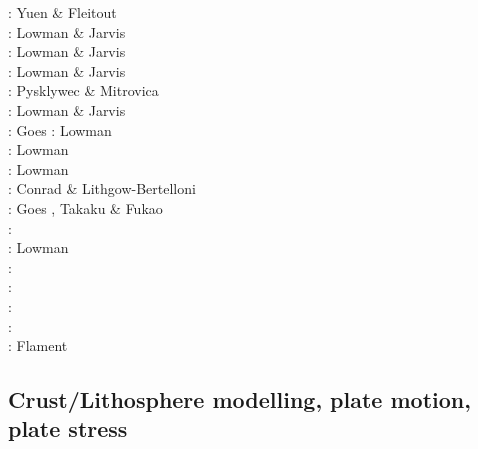 \begin{scriptsize}
\nineteeneightyfive: Yuen \& Fleitout \cite{yufl85}\\
\nineteenninetythree: Lowman \& Jarvis \cite{loja93}\\
\nineteenninetyfive: Lowman \& Jarvis \cite{loja95}\\
\nineteenninetysix: Lowman \& Jarvis \cite{loja96}\\
\nineteenninetyeight: Pysklywec \& Mitrovica \cite{pymi98}\\
\nineteenninetynine: Lowman \& Jarvis \cite{loja99}\\
\twothousand: Goes \etal \cite{golw00}
\twothousandone: Lowman \etal \cite{lokg01} \\
\twothousandthree: Lowman \etal \cite{lokg03} \\
\twothousandfour: Lowman \etal \cite{lokg04} \\
\twothousandsix: Conrad \& Lithgow-Bertelloni \cite{coli06}\\
\twothousandeight: Goes \etal \cite{gocm08}, Takaku \& Fukao \cite{tafu08}\\
\twothousandten: \cite{wamg10}\cite{stgb10}\cite{cobe10}\\
\twothousandeleven: Lowman \etal \cite{lokt11}\\
\twothousandtwelve: \cite{algs12}\cite{roct12}\cite{crtm12}\\
\twothousandthirteen: \cite{ghbh13}\cite{yahb13}\\
\twothousandsixteen: \cite{macs16}\\
\twothousandeighteen: \cite{hulz18}\cite{osss18b}\\
\twothousandnineteen: Flament \cite{flam19}
\end{scriptsize}

\subsection{Crust/Lithosphere modelling, plate motion, plate stress}

